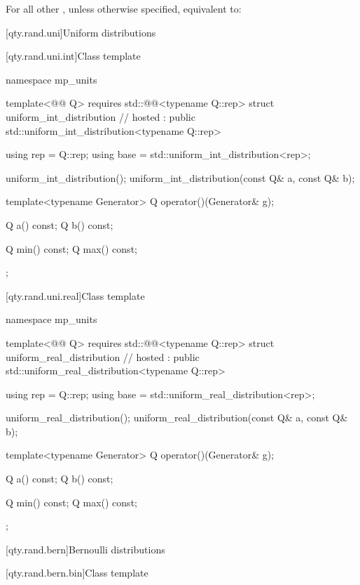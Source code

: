 \begin{itemdescr}
\pnum
\effects
For all other ,
unless otherwise specified,
equivalent to:
\end{itemdescr}

[qty.rand.uni]{Uniform distributions}

[qty.rand.uni.int]{Class template }

\begin{codeblock}
namespace mp_units {
template<@@ Q>
  requires std::@@<typename Q::rep>
struct uniform_int_distribution                                                         // hosted
    : public std::uniform_int_distribution<typename Q::rep> {
  using rep = Q::rep;
  using base = std::uniform_int_distribution<rep>;

  uniform_int_distribution();
  uniform_int_distribution(const Q& a, const Q& b);

  template<typename Generator>
  Q operator()(Generator& g);

  Q a() const;
  Q b() const;

  Q min() const;
  Q max() const;
};
}
\end{codeblock}

[qty.rand.uni.real]{Class template }

\begin{codeblock}
namespace mp_units {
template<@@ Q>
  requires std::@@<typename Q::rep>
struct uniform_real_distribution                                                        // hosted
    : public std::uniform_real_distribution<typename Q::rep> {
  using rep = Q::rep;
  using base = std::uniform_real_distribution<rep>;

  uniform_real_distribution();
  uniform_real_distribution(const Q& a, const Q& b);

  template<typename Generator>
  Q operator()(Generator& g);

  Q a() const;
  Q b() const;

  Q min() const;
  Q max() const;
};
}
\end{codeblock}

[qty.rand.bern]{Bernoulli distributions}

[qty.rand.bern.bin]{Class template }

